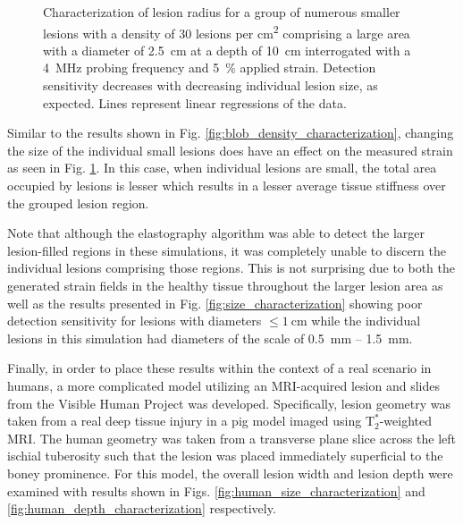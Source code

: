 			\begin{figure}[!htb]
				\centering
				\caption[Quasi-static clustered lesion radius characterization]{Characterization of lesion radius for a group of numerous smaller lesions with a density of 30 lesions per \si{\cm\squared} comprising a large area with a diameter of \SI{2.5}{\cm} at a depth of \SI{10}{\cm} interrogated with a \SI{4}{\MHz} probing frequency and \SI{5}{\percent} applied strain. Detection sensitivity decreases with decreasing individual lesion size, as expected. Lines represent linear regressions of the data.}
				\label{fig:blob_radius_characterization}
			\end{figure}

			Similar to the results shown in Fig. \ref{fig:blob_density_characterization}, changing the size of the individual small lesions does have an effect on the measured strain as seen in Fig. \ref{fig:blob_radius_characterization}. In this case, when individual lesions are small, the total area occupied by lesions is lesser which results in a lesser average tissue stiffness over the grouped lesion region.

			Note that although the elastography algorithm was able to detect the larger lesion-filled regions in these simulations, it was completely unable to discern the individual lesions comprising those regions. This is not surprising due to both the generated strain fields in the healthy tissue throughout the larger lesion area as well as the results presented in Fig. \ref{fig:size_characterization} showing poor detection sensitivity for lesions with diameters $\leq \SI{1}{\cm}$ while the individual lesions in this simulation had diameters of the scale of \SI{0.5}{\mm} -- \SI{1.5}{\mm}.

			Finally, in order to place these results within the context of a real scenario in humans, a more complicated model utilizing an MRI-acquired lesion and slides from the Visible Human Project \cite{visiblehuman} was developed. Specifically, lesion geometry was taken from a real deep tissue injury in a pig model imaged using $\mathrm{T}_2^*$-weighted MRI. The human geometry was taken from a transverse plane slice across the left ischial tuberosity such that the lesion was placed immediately superficial to the boney prominence. For this model, the overall lesion width and lesion depth were examined with results shown in Figs. \ref{fig:human_size_characterization} and \ref{fig:human_depth_characterization} respectively.

